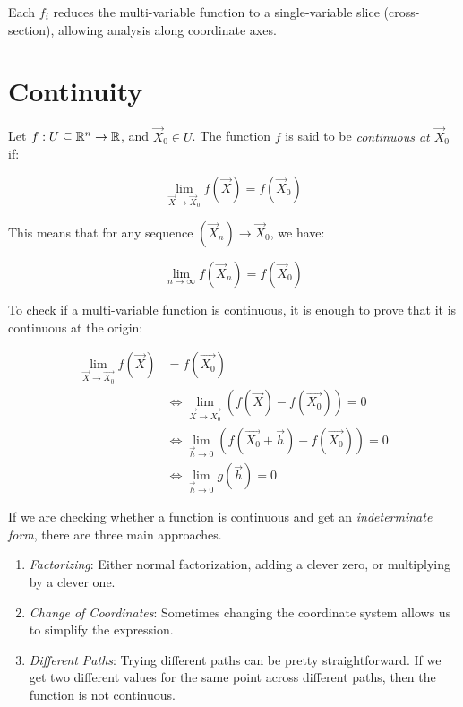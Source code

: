 Each \( f_i \) reduces the multi-variable function to a single-variable slice (cross-section), 
allowing analysis along coordinate axes.

\section{Continuity}

Let \( f : U \subseteq \mathbb{R}^n \to \mathbb{R} \), and \( \vec{X}_0 \in U \). The function 
\(f\) is said to be \emph{continuous at \( \vec{X}_0 \)} if:

\[
    \lim_{\vec{X} \to \vec{X}_0} f(\vec{X}) = f(\vec{X}_0)
\]

This means that for any sequence \( (\vec{X}_n) \to \vec{X}_0 \), we have:

\[
    \lim_{n \to \infty} f(\vec{X}_n) = f(\vec{X}_0)
\]

To check if a multi-variable function is continuous, it is enough to prove that it is continuous at 
the origin:

\begin{align*}
    \lim_{\vec{X} \to \vec{X_0}}f(\vec{X}) &= f(\vec{X_0}) \\
    &\iff \lim_{\vec{X} \to \vec{X_0}} \left(f(\vec{X}) - f(\vec{X_0})\right) = 0 \\
    &\iff \lim_{\vec{h} \to 0} \left(f(\vec{X_0} + \vec{h}) - f(\vec{X_0})\right) = 0 \\
    &\iff \lim_{\vec{h} \to 0} g(\vec{h}) = 0
\end{align*}

If we are checking whether a function is continuous and get an \emph{indeterminate form}, there are three main 
approaches.

\begin{enumerate}
    
    \item \emph{Factorizing}: Either normal factorization, adding a clever zero, or multiplying by a clever 
          one.
    
    \item \emph{Change of Coordinates}: Sometimes changing the coordinate system allows us to simplify the 
          expression.
    
    \item \emph{Different Paths}: Trying different paths can be pretty straightforward. If we get two 
          different values for the same point across different paths, then the function is not continuous.

\end{enumerate}

